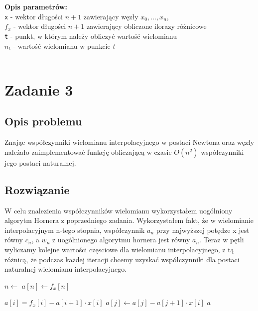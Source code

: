 \documentclass[12pt, a4paper]{article}
\begin{document}
\textbf{Opis parametrów:} \\
\texttt{x} - wektor długości $n + 1$ zawierający węzły $x_{0}, \ldots, x_{n}$, \\
\texttt{$f_x$} - wektor długości $n + 1$ zawierający obliczone ilorazy różnicowe \\
\texttt{t} - punkt, w którym należy obliczyć wartość wielomianu\\
\texttt{$n_t$} - wartość wielomianu w punkcie $t$\\\\


\newpage

\section{Zadanie 3}
\subsection{Opis problemu}
Znając współczynniki wielomianu interpolacyjnego w postaci Newtona oraz węzły należało zaimplementować funkcję obliczającą w czasie $O(n^2)$ współczynniki jego postaci naturalnej.

\subsection{Rozwiązanie}
W celu znalezienia współczynników wielomianu wykorzystałem uogólniony algorytm Hornera z poprzedniego zadania. Wykorzystałem fakt, że w wielomianie interpolacyjnym n-tego stopnia, współczynnik $a_n$ przy najwyższej potędze x jest równy $c_n$, a $w_n$ z uogólnionego algorytmu hornera jest równy $a_n$. Teraz w pętli wyliczamy kolejne wartości częsciowe dla wielomianu interpolacyjnego, z tą różnicą, że podczas każdej iteracji chcemy uzyskać współczynniki dla postaci naturalnej wielomianu interpolacyjnego.\\

\begin{algorithm}
    \begin{algorithmic}[1]
            \State $n \gets$ 
            \State $a[n] \gets f_x[n]$

                \State $a[i] = f_{x}[i] - a[i+1] \cdot x[i]$
                    \State $a[j] \gets a[j] - a[j + 1] \cdot x[i]$
                \EndFor
            \EndFor
            \State \Return $a$
        \EndFunction
    \end{algorithmic}
\end{algorithm} 
\end{document}
